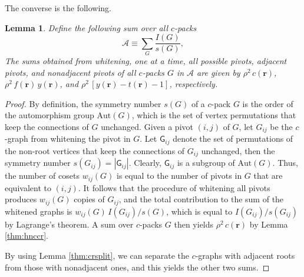 \documentclass[preprint]{revtex4-1}
\newtheorem{lemm}[thrm]{Lemma}
\newcommand{\vct}[1]{\mathbf{#1}}
\providecommand{\vr}{} %
\renewcommand{\vr}{\vct{r}}
\newcommand{\A}{\mathcal{A}}
\newcommand{\G}{\mathsf{G}}
\newcommand{\Aut}{\mathrm{Aut}}
\begin{document}


The converse is the following.


\begin{lemm}
Define the following sum over all $c$-packs
\begin{equation}
  \A \equiv \sum_G \frac{ I(G) }{ s(G) },
  \label{eq:Adef}
\end{equation}
The sums obtained from whitening,
one at a time,
all possible pivots,
adjacent pivots,
and nonadjacent pivots
of all $c$-packs $G$ in $\A$
are given by
$\rho^2 \, c(\vr)$,
$\rho^2 \, f(\vr) \, y(\vr)$,
and
$\rho^2 \, [y(\vr) - t(\vr) - 1]$,
respectively.
\label{thm:whitenAhnc}
\end{lemm}



\begin{proof}
By definition,
  the symmetry number $s(G)$
  of a $c$-pack $G$
  is the order of the automorphism group $\Aut(G)$,
  which is the set of vertex permutations
  that keep the connections of $G$ unchanged.
%
Given a pivot $(i, j)$ of $G$,
  let $G_{ij}$ be the $c$-graph
  from whitening the pivot in $G$.
%
Let $\G_{ij}$
  denote the set of permutations of the non-root vertices
  that keep the connections of $G_{ij}$ unchanged,
then the symmetry number $s(G_{ij}) = |\G_{ij}|$.
%
Clearly, $\G_{ij}$ is a subgroup of $\Aut(G)$.
%
%
Thus, the number of cosets $w_{ij}(G)$
is equal to the number of pivots in $G$
that are equivalent to $(i, j)$.
%
It follows that the procedure of whitening all pivots
produces $w_{ij}(G)$ copies of $G_{ij}$,
and the total contribution
to the sum of the whitened graphs
is $w_{ij}(G) \, I(G_{ij})/s(G)$,
which is equal to $I(G_{ij})/s(G_{ij})$ by Lagrange's theorem.
%
A sum over $c$-packs $G$
then yields $\rho^2 \, c(\vr)$ by Lemma \ref{thm:hnccr}.

By using Lemma \ref{thm:crsplit},
  we can separate the $c$-graphs with adjacent roots
  from those with nonadjacent ones,
  and this yields the other two sums.
\end{proof}
\end{document}

